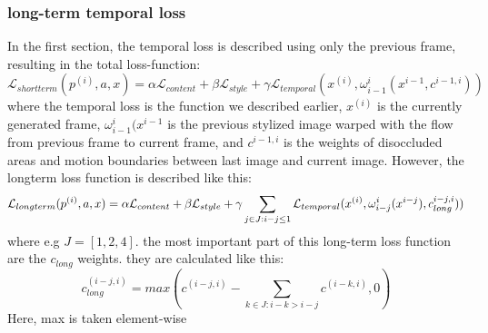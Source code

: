 \subsubsection{long-term temporal loss}
In the first section, the temporal loss is described using only the previous frame, resulting in the total loss-function: 
\begin{equation}
\mathcal{L}_{shortterm}(p^{(i)}, a, x) = \alpha \mathcal{L}_{content} + \beta \mathcal{L}_{style} + \gamma \mathcal{L}_{temporal}(x^{(i)}, \omega_{i-1}^i(x^{i-1}, c^{i-1, i}))
\end{equation}
where the temporal loss is the function we described earlier, $x^{(i)}$ is the currently generated frame,  $\omega_{i-1}^i(x^{i-1}$ is the previous stylized image warped with the flow from previous frame to current frame, and $c^{i-1, i}$ is the weights of disoccluded areas and motion boundaries between last image and current image. However, the longterm loss function is described like this: \newline
\begin{equation}
\mathcal{L}_{longterm}(p^{(i)}, a, x) = \alpha \mathcal{L}_{content} + \beta \\\mathcal{L}_{style} + \gamma \sum_{j\in J: i-j \leq 1}\mathcal{L}_{temporal}(x^{(i)}, \omega_{i-j}^i(x^{i-j}), c_{long}^{i-j, i}))
\end{equation}
where e.g $J = [1, 2, 4]$. the most important part of this long-term loss function are the $c_{long}$ weights. they are calculated like this:\newline
\begin{equation}
c_{long}^{(i-j, i)} = max(c^{(i-j, i)} - \sum_{k\in J: i - k > i - j} c^{(i-k, i)}, 0)
\end{equation}
Here, max is taken element-wise\newline
